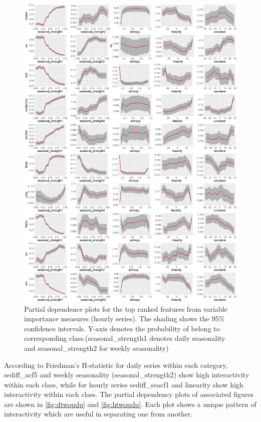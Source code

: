 \documentclass[11pt,a4paper,]{article}
\begin{document}
\begin{figure}
\centering
\includegraphics{figures/hourlypdp-1.png}
\caption{\label{fig:hourlypdp}Partial dependence plots for the top ranked
features from variable importance measures (hourly series). The shading
shows the 95\% confidence intervals. Y-axis denotes the probability of
belong to corresponding class.(seasonal\_strength1 denotes daily
seasonality and seasonal\_strength2 for weekly seasonality)}
\end{figure}

According to Friedman's H-statistic for daily series within each
category, sediff\_acf5 and weekly seasonality (seasonal\_strength2) show
high interactivity within each class, while for hourly series
sediff\_seacf1 and linearity show high interactivity within each class.
The partial dependency plots of associated figures are shown in
\autoref{fig:dtwopdp} and \autoref{fig:htwopdp}. Each plot shows a
unique pattern of interactivity which are useful in separating one from
another.
\end{document}
